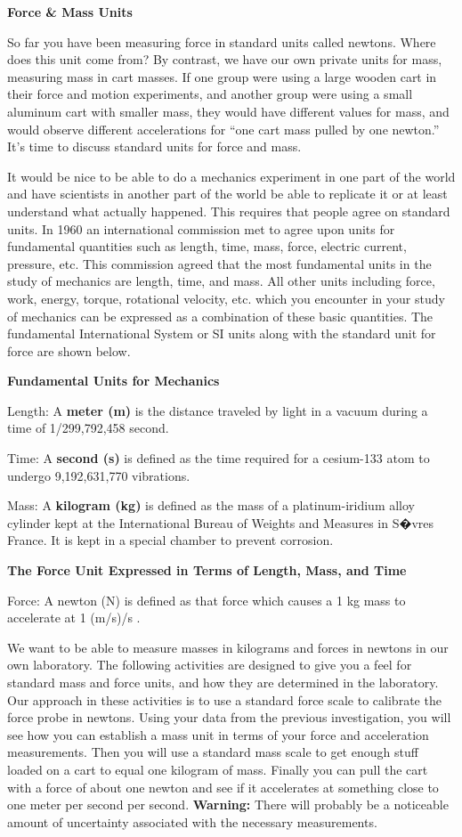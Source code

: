 \textbf{Force \& Mass Units} 

So far you have been measuring force in standard units called newtons. Where
does this unit come from? By contrast, we have our own private units for mass,
measuring mass in cart masses. If one group were using a large wooden cart in
their force and motion experiments, and another group were using a small aluminum
cart with smaller mass, they would have different values for mass, and would
observe different accelerations for ``one cart mass pulled by one newton.''
It's time to discuss standard units for force and mass.

It would be nice to be able to do a mechanics experiment in one part of the
world and have scientists in another part of the world be able to replicate
it or at least understand what actually happened. This requires that people
agree on standard units. In 1960 an international commission met to agree upon
units for fundamental quantities such as length, time, mass, force, electric
current, pressure, etc. This commission agreed that the most fundamental units
in the study of mechanics are length, time, and mass. All other units including
force, work, energy, torque, rotational velocity, etc. which you encounter in
your study of mechanics can be expressed as a combination of these basic quantities.
The fundamental International System or SI units along with the standard unit
for force are shown below.

\textbf{Fundamental Units for Mechanics }

Length: A \textbf{meter (m)} is the distance traveled by light in a vacuum during
a time of 1/299,792,458 second. 

Time: A \textbf{second (s)} is defined as the time required for a cesium-133
atom to undergo 9,192,631,770 vibrations. 

Mass: A \textbf{kilogram (kg)} is defined as the mass of a platinum-iridium
alloy cylinder kept at the International Bureau of Weights and Measures in S�vres
France. It is kept in a special chamber to prevent corrosion.

\textbf{The Force Unit Expressed in Terms of Length, Mass, and Time} 

Force: A newton (N) is defined as that force which causes a 1 kg mass to accelerate
at 1 (m/s)/s . 

We want to be able to measure masses in kilograms and forces in newtons in our
own laboratory. The following activities are designed to give you a feel for
standard mass and force units, and how they are determined in the laboratory.
Our approach in these activities is to use a standard force scale to calibrate
the force probe in newtons. Using your data from the previous investigation,
you will see how you can establish a mass unit in terms of your force and acceleration
measurements. Then you will use a standard mass scale to get enough stuff loaded
on a cart to equal one kilogram of mass. Finally you can pull the cart with
a force of about one newton and see if it accelerates at something close to
one meter per second per second. \textbf{Warning:} There will probably be a
noticeable amount of uncertainty associated with the necessary measurements.

